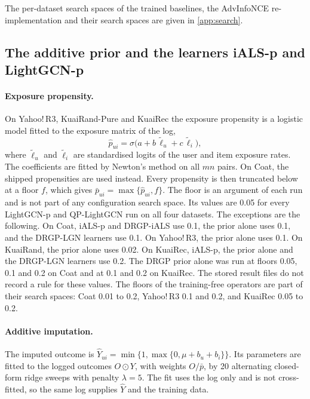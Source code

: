 The per-dataset search spaces of the trained baselines, the AdvInfoNCE re-implementation and their search spaces are given in \ref{app:search}.

\subsection{The additive prior and the learners iALS-p and LightGCN-p}\label{sec:prior}

\paragraph{Exposure propensity.}
On Yahoo!\,R3, KuaiRand-Pure and KuaiRec the exposure propensity is a logistic model fitted to the exposure matrix
of the log,
\begin{equation*}
\hat p_{ui}=\sigma\bigl(a+b\,\tilde\ell_u+c\,\tilde\ell_i\bigr),
\end{equation*}
where $\tilde\ell_u$ and $\tilde\ell_i$ are standardised logits of the user and item exposure rates. The
coefficients are fitted by Newton's method on all $mn$ pairs. On Coat, the shipped propensities are used
instead. Every propensity is then truncated below at a floor $f$, which gives $\bar p_{ui}=\max\{\hat p_{ui},f\}$.
The floor is an argument of each run and is not part of any configuration search space. Its values are 0.05 for every
LightGCN-p and QP-LightGCN run on all four datasets. The exceptions are the following. On Coat, iALS-p and
DRGP-iALS use 0.1, the prior alone uses 0.1, and the DRGP-LGN learners use 0.1. On Yahoo!\,R3, the prior alone
uses 0.1. On KuaiRand, the prior alone uses 0.02. On KuaiRec, iALS-p, the prior alone and the DRGP-LGN learners
use 0.2. The DRGP prior alone was run at floors 0.05, 0.1 and 0.2 on Coat and at 0.1 and 0.2 on KuaiRec. The
stored result files do not record a rule for these values. The floors of the training-free operators are part of
their search spaces: Coat 0.01 to 0.2, Yahoo!\,R3 0.1 and 0.2, and KuaiRec 0.05 to 0.2.

\paragraph{Additive imputation.}
The imputed outcome is $\hat Y_{ui}=\min\{1,\max\{0,\mu+b_u+b_i\}\}$. Its parameters are fitted to the logged
outcomes $O\odot Y$, with weights $O/\bar p$, by 20 alternating closed-form ridge sweeps with penalty
$\lambda=5$. The fit uses the log only and is not cross-fitted, so the same log supplies $\hat Y$ and the training
data.

